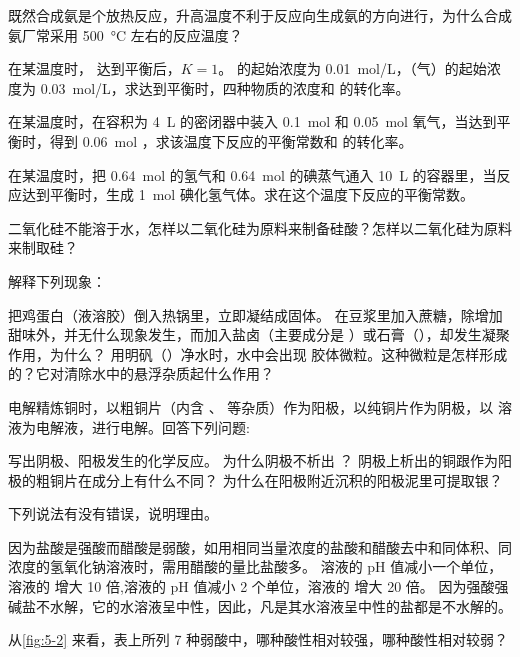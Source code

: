 \begin{Exercise}
\begin{question}
\begin{tasks}
    \task 既然合成氨是个放热反应，升高温度不利于反应向生成氨的方向进行，为什么合成氨厂常采用 \qty{500}{\celsius} 左右的反应温度？
  \end{tasks}
  \item 在某温度时， 达到平衡后，$K=1$。 的起始浓度为 \qty{0.01}{mol/L}，（气）的起始浓度为 \qty{0.03}{mol/L}，求达到平衡时，四种物质的浓度和  的转化率。
  \item 在某温度时，在容积为 \qty{4}{L} 的密闭器中装入 \qty{0.1}{mol}  和 \qty{0.05}{mol} 氧气，当达到平衡时，得到 \qty{0.06}{mol} ，求该温度下反应的平衡常数和  的转化率。
  \item 在某温度时，把 \qty{0.64}{mol} 的氢气和 \qty{0.64}{mol} 的碘蒸气通入 \qty{10}{L} 的容器里，当反应达到平衡时，生成 \qty{1}{mol} 碘化氢气体。求在这个温度下反应的平衡常数。
  \item 二氧化硅不能溶于水，怎样以二氧化硅为原料来制备硅酸？怎样以二氧化硅为原料来制取硅？
  \item 解释下列现象：
  \begin{tasks}
    \task 把鸡蛋白（液溶胶）倒入热锅里，立即凝结成固体。
    \task 在豆浆里加入蔗糖，除增加甜味外，并无什么现象发生，而加入盐卤（主要成分是 ）或石膏（），却发生凝聚作用，为什么？
    \task 用明矾（）净水时，水中会出现  胶体微粒。这种微粒是怎样形成的？它对清除水中的悬浮杂质起什么作用？
  \end{tasks}
  \item 电解精炼铜时，以粗铜片（内含 、 等杂质）作为阳极，以纯铜片作为阴极，以  溶液为电解液，进行电解。回答下列问题:
  \begin{tasks}
    \task 写出阴极、阳极发生的化学反应。
    \task 为什么阴极不析出 ？
    \task 阴极上析出的铜跟作为阳极的粗铜片在成分上有什么不同？
    \task 为什么在阳极附近沉积的阳极泥里可提取银？
  \end{tasks}
  \item 下列说法有没有错误，说明理由。
  \begin{tasks}
    \task 因为盐酸是强酸而醋酸是弱酸，如用相同当量浓度的盐酸和醋酸去中和同体积、同浓度的氢氧化钠溶液时，需用醋酸的量比盐酸多。
    \task 溶液的 pH 值减小一个单位，溶液的 \ce{[H+]} 增大 10 倍,溶液的 pH 值减小 2 个单位，溶液的 \ce{[H+]} 增大 20 倍。
    \task 因为强酸强碱盐不水解，它的水溶液呈中性，因此，凡是其水溶液呈中性的盐都是不水解的。
  \end{tasks}
  \item 从\cref{fig:5-2} 来看，表上所列 7 种弱酸中，哪种酸性相对较强，哪种酸性相对较弱？

\end{question}
\end{Exercise}
